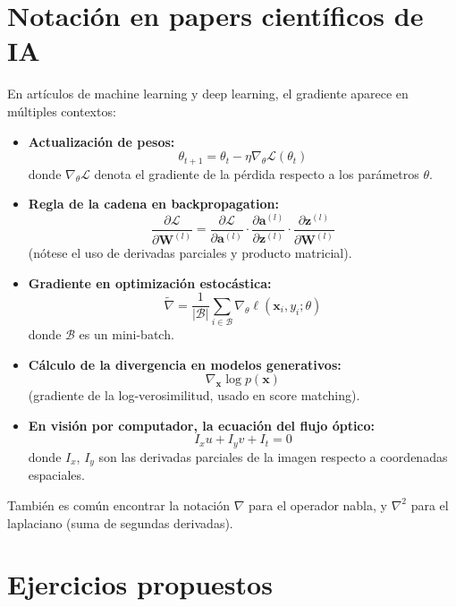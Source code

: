 \documentclass[12pt,a4paper,openany,oneside]{book}
\begin{document}
\section{Notación en papers científicos de IA}

En artículos de machine learning y deep learning, el gradiente aparece en múltiples contextos:

\begin{itemize}
    \item \textbf{Actualización de pesos:} 
    \[
    \theta_{t+1} = \theta_t - \eta \nabla_{\theta} \mathcal{L}(\theta_t)
    \]
    donde $\nabla_{\theta} \mathcal{L}$ denota el gradiente de la pérdida respecto a los parámetros $\theta$.

    \item \textbf{Regla de la cadena en backpropagation:}
    \[
    \frac{\partial \mathcal{L}}{\partial \mathbf{W}^{(l)}} = \frac{\partial \mathcal{L}}{\partial \mathbf{a}^{(l)}} \cdot \frac{\partial \mathbf{a}^{(l)}}{\partial \mathbf{z}^{(l)}} \cdot \frac{\partial \mathbf{z}^{(l)}}{\partial \mathbf{W}^{(l)}}
    \]
    (nótese el uso de derivadas parciales y producto matricial).

    \item \textbf{Gradiente en optimización estocástica:} 
    \[
    \tilde{\nabla} = \frac{1}{|\mathcal{B}|} \sum_{i \in \mathcal{B}} \nabla_{\theta} \ell(\mathbf{x}_i, y_i; \theta)
    \]
    donde $\mathcal{B}$ es un mini-batch.

    \item \textbf{Cálculo de la divergencia en modelos generativos:}
    \[
    \nabla_{\mathbf{x}} \log p(\mathbf{x})
    \]
    (gradiente de la log-verosimilitud, usado en score matching).

    \item \textbf{En visión por computador, la ecuación del flujo óptico:}
    \[
    I_x u + I_y v + I_t = 0
    \]
    donde $I_x$, $I_y$ son las derivadas parciales de la imagen respecto a coordenadas espaciales.
\end{itemize}

También es común encontrar la notación $\nabla$ para el operador nabla, y $\nabla^2$ para el laplaciano (suma de segundas derivadas).

\section{Ejercicios propuestos}
\end{document}

